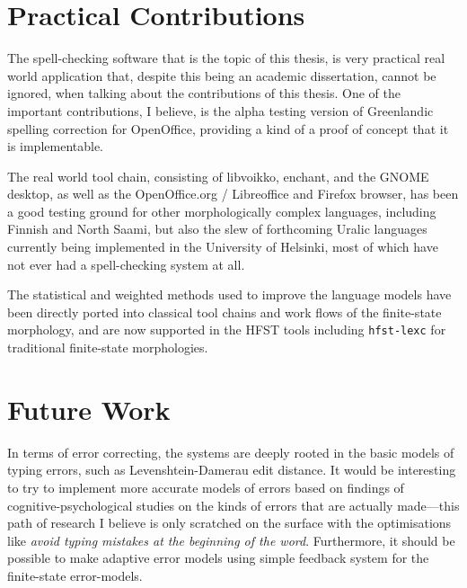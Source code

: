 \documentclass[officiallayout,draft]{unihelcompling}
\begin{document}
\section{Practical Contributions}
\label{sec:practical-contributions}

The spell-checking software that is the topic of this thesis, is very
practical real world application that, despite this being an academic
dissertation, cannot be ignored, when talking about the contributions of this
thesis. One of the important contributions, I believe, is the alpha testing
version of Greenlandic spelling correction for OpenOffice, providing a kind of
a proof of concept that it is implementable.

The real world tool chain, consisting of libvoikko, enchant, and the GNOME
desktop, as well as the OpenOffice.org / Libreoffice and Firefox browser, has
been a good testing ground for other morphologically complex languages,
including Finnish and North Saami, but also the slew of forthcoming Uralic
languages currently being implemented in the University of Helsinki, most of
which have not ever had a spell-checking system at all. 

The statistical and weighted methods used to improve the language models have
been directly ported into classical tool chains and work flows of the 
finite-state morphology, and are now supported in the HFST tools including
\texttt{hfst-lexc} for traditional finite-state morphologies.

\section{Future Work}
\label{sec:future-work}

In terms of error correcting, the systems are deeply rooted in the basic models
of typing errors, such as Levenshtein-Damerau edit distance. It would be
interesting to try to implement more accurate models of errors based on
findings of cognitive-psychological studies on the kinds of errors that are
actually made---this path of research I believe is only scratched on the
surface with the optimisations like \emph{avoid typing mistakes at the
beginning of the word}. Furthermore, it should be possible to make adaptive
error models using simple feedback system for the finite-state error-models.
\end{document}
